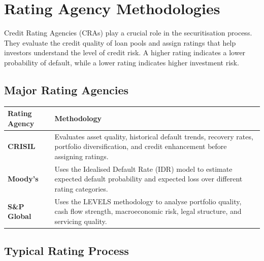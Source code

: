 
\section{Rating Agency Methodologies}

Credit Rating Agencies (CRAs) play a crucial role in the securitisation process. They evaluate the credit quality of loan pools and assign ratings that help investors understand the level of credit risk. A higher rating indicates a lower probability of default, while a lower rating indicates higher investment risk.

\vspace{0.4cm}

\subsection*{Major Rating Agencies}

\renewcommand{\arraystretch}{1.5}

\begin{tabularx}{\textwidth}{|p{3.5cm}|X|}
	\hline
	\rowcolor{TableHeader}
	\textbf{Rating Agency} & \textbf{Methodology} \\
	\hline
	
	\textbf{CRISIL}
	&
	Evaluates asset quality, historical default trends, recovery rates, portfolio diversification, and credit enhancement before assigning ratings.
	\\
	\hline
	
	\textbf{Moody's}
	&
	Uses the Idealised Default Rate (IDR) model to estimate expected default probability and expected loss over different rating categories.
	\\
	\hline
	
	\textbf{S\&P Global}
	&
	Uses the LEVELS methodology to analyse portfolio quality, cash flow strength, macroeconomic risk, legal structure, and servicing quality.
	\\
	\hline
	
\end{tabularx}

\vspace{0.6cm}

\subsection*{Typical Rating Process}

